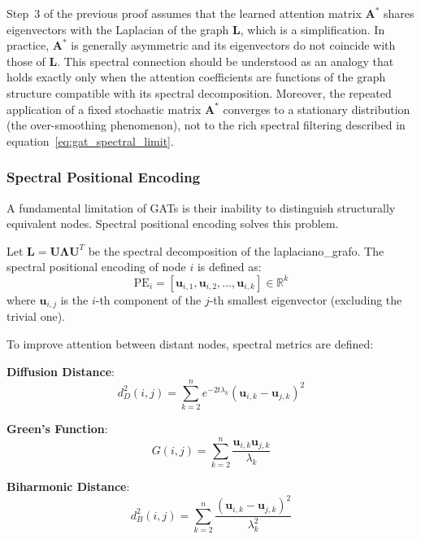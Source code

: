 \begin{remark}
Step~3 of the previous proof assumes that the learned attention matrix $\mathbf{A}^*$ shares eigenvectors with the Laplacian of the graph $\mathbf{L}$, which is a simplification. In practice, $\mathbf{A}^*$ is generally asymmetric and its eigenvectors do not coincide with those of $\mathbf{L}$. This spectral connection should be understood as an analogy that holds exactly only when the attention coefficients are functions of the graph structure compatible with its spectral decomposition. Moreover, the repeated application of a fixed stochastic matrix $\mathbf{A}^*$ converges to a stationary distribution (the over-smoothing phenomenon), not to the rich spectral filtering described in equation~\eqref{eq:gat_spectral_limit}.
\end{remark}

\subsubsection{Spectral Positional Encoding}\label{subsubsec:codificacion_posicional_espectral}

A fundamental limitation of \glspl{GAT} is their inability to distinguish structurally equivalent nodes. Spectral positional encoding solves this problem.

\begin{definition}\label{def:spectral_positional_encoding}
Let $\mathbf{L} = \mathbf{U}\mathbf{\Lambda}\mathbf{U}^T$ be the spectral decomposition of the \gls{laplaciano_grafo}. The spectral positional encoding of node $i$ is defined as:
\begin{equation}
    \text{PE}_i = [\mathbf{u}_{i,1}, \mathbf{u}_{i,2}, \ldots, \mathbf{u}_{i,k}] \in \mathbb{R}^k
    \label{eq:spectral_positional_encoding}
\end{equation}
where $\mathbf{u}_{i,j}$ is the $i$-th component of the $j$-th smallest eigenvector (excluding the trivial one).
\end{definition}

\begin{definition}\label{def:spectral_distances_attention}
To improve attention between distant nodes, spectral metrics are defined:

\textbf{Diffusion Distance}:
\begin{equation}
    d_D^2(i,j) = \sum_{k=2}^{n} e^{-2t\lambda_k} (\mathbf{u}_{i,k} - \mathbf{u}_{j,k})^2
    \label{eq:diffusion_distance}
\end{equation}

\textbf{Green's Function}:
\begin{equation}
    G(i,j) = \sum_{k=2}^{n} \frac{\mathbf{u}_{i,k} \mathbf{u}_{j,k}}{\lambda_k}
    \label{eq:green_function_distance}
\end{equation}

\textbf{Biharmonic Distance}:
\begin{equation}
    d_B^2(i,j) = \sum_{k=2}^{n} \frac{(\mathbf{u}_{i,k} - \mathbf{u}_{j,k})^2}{\lambda_k^2}
    \label{eq:biharmonic_distance}
\end{equation}
\end{definition}

